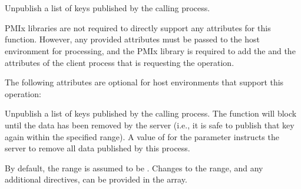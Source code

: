 \section{}

\summary

Unpublish a list of keys published by the calling process.

\format


\begin{arglist}
\end{arglist}

\returnsimple

\reqattrstart
\ac{PMIx} libraries are not required to directly support any attributes for this function. However, any provided attributes must be passed to the host environment for processing, and the \ac{PMIx} library is required to add the  and the  attributes of the client process that is requesting the operation.

\reqattrend

\optattrstart
The following attributes are optional for host environments that support this operation:


\optattrend

\descr

Unpublish a list of keys published by the calling process.
The function will block until the data has been removed by the server (i.e., it is safe to publish that key again within the specified range).
A value of  for the  parameter instructs the server to remove all data published by this process.

By default, the range is assumed to be .
Changes to the range, and any additional directives, can be provided in the  array.


